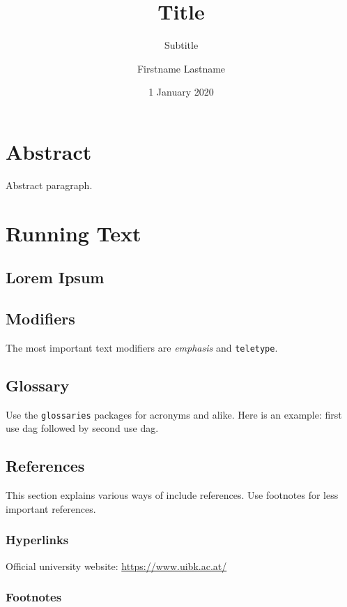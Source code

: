 \documentclass[parskip=half]{scrbook}
\title{Title}
\subtitle{Subtitle}
\author{Firstname Lastname}
\date{1 January 2020}
\providecommand{\listoflistings}{\lstlistoflistings}
\begin{document}
\frontmatter
\maketitle
\tableofcontents
\listoffigures
\listoftables
\listoflistings

\chapter*{Abstract}

Abstract paragraph.

\mainmatter

\chapter{Running Text}

\section{Lorem Ipsum}

\lipsum[1-2]

\section{Modifiers}

The most important text modifiers are \emph{emphasis} and \texttt{teletype}.

\section{Glossary}

Use the \texttt{glossaries} packages for acronyms and alike.
Here is an example: first use \gls{dag} followed by second use \gls{dag}.

\section{References}

This section explains various ways of include references.
Use footnotes for less important references.

\subsection{Hyperlinks}

Official university website: \url{https://www.uibk.ac.at/}

\subsection{Footnotes}
\end{document}
